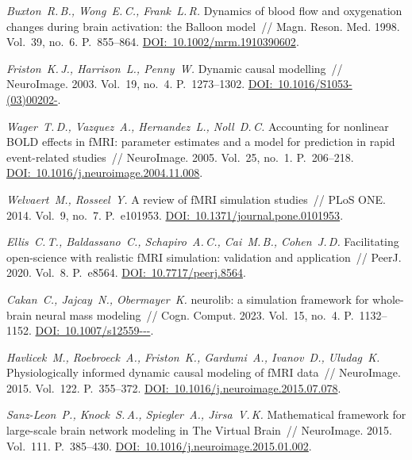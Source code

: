 \begin{ltrtr}
	\textit{Buxton~R.\,B., Wong~E.\,C., Frank~L.\,R.} Dynamics of blood flow and oxygenation changes during brain activation: the Balloon model~// Magn. Reson. Med. 1998. Vol.~39, no.~6. P.~855--864. \href{https://doi.org/10.1002/mrm.1910390602}{DOI:~10.1002/\allowbreak mrm.1910390602}.

	\textit{Friston~K.\,J., Harrison~L., Penny~W.} Dynamic causal modelling~// NeuroImage. 2003. Vol.~19, no.~4. P.~1273--1302. \href{https://doi.org/10.1016/S1053-8119(03)00202-7}{DOI:~10.1016/\allowbreak S1053-(03)00202-}.

	\textit{Wager~T.\,D., Vazquez~A., Hernandez~L., Noll~D.\,C.} Accounting for nonlinear BOLD effects in fMRI: parameter estimates and a model for prediction in rapid event-related studies~// NeuroImage. 2005. Vol.~25, no.~1. P.~206--218. \href{https://doi.org/10.1016/j.neuroimage.2004.11.008}{DOI:~10.1016/\allowbreak j.neuroimage.2004.11.008}.

	\textit{Welvaert~M., Rosseel~Y.} A review of fMRI simulation studies~// PLoS ONE. 2014. Vol.~9, no.~7. P.~e101953. \href{https://doi.org/10.1371/journal.pone.0101953}{DOI:~10.1371/\allowbreak journal.pone.0101953}.

	\textit{Ellis~C.\,T., Baldassano~C., Schapiro~A.\,C., Cai~M.\,B., Cohen~J.\,D.} Facilitating open-science with realistic fMRI simulation: validation and application~// PeerJ. 2020. Vol.~8. P.~e8564. \href{https://doi.org/10.7717/peerj.8564}{DOI:~10.7717/\allowbreak peerj.8564}.

	\textit{Cakan~C., Jajcay~N., Obermayer~K.} neurolib: a simulation framework for whole-brain neural mass modeling~// Cogn. Comput. 2023. Vol.~15, no.~4. P.~1132--1152. \href{https://doi.org/10.1007/s12559-021-09931-9}{DOI:~10.1007/\allowbreak s12559---}.

	\textit{Havlicek~M., Roebroeck~A., Friston~K., Gardumi~A., Ivanov~D., Uludag~K.} Physiologically informed dynamic causal modeling of fMRI data~// NeuroImage. 2015. Vol.~122. P.~355--372. \href{https://doi.org/10.1016/j.neuroimage.2015.07.078}{DOI:~10.1016/\allowbreak j.neuroimage.2015.07.078}.

	\textit{Sanz-Leon~P., Knock~S.\,A., Spiegler~A., Jirsa~V.\,K.} Mathematical framework for large-scale brain network modeling in The Virtual Brain~// NeuroImage. 2015. Vol.~111. P.~385--430. \href{https://doi.org/10.1016/j.neuroimage.2015.01.002}{DOI:~10.1016/\allowbreak j.neuroimage.2015.01.002}.


\end{ltrtr}
